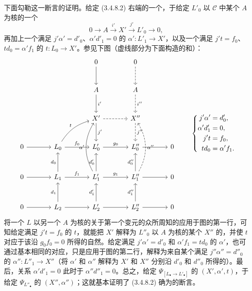 下面勾勒这一断言的证明。给定 (3.4.8.2) 右端的一个，于给定 $L'_0$ 以 $\mathcal C$ 中某个 $A$ 为核的一个
\[
0\longrightarrow A\xrightarrow{i'}X'\xrightarrow{j'}L'_0\longrightarrow0,
\]
再加上一个满足 $j'\alpha'=d'_0$、$\alpha'd'_1=0$ 的 $\alpha':L'_1\to X'$，以及一个满足 $j't=f_0$、$td_0=\alpha'f_1$ 的 $t:L_0\to X'$。参见下图（虚线部分为下面构造的和）：
\[
\begin{tikzcd}[column sep=large,row sep=large]
&&0\arrow[d]&0\arrow[d,dashed]\\
&&A\arrow[d,"i'"]&A\arrow[d,dashed,"i''"]\\
&&X'\arrow[d,"j'"]\arrow[r,dashed]&X''\arrow[d,dashed,"j''"]\\
0\arrow[r]&L_0\arrow[r,"f_0"]\arrow[ur,bend left=20,"t"]&L'_0\arrow[r,"g_0"]&L''_0\arrow[r]&0\\
0\arrow[r]&L_1\arrow[u,"d_0"]\arrow[r,"f_1"]&L'_1\arrow[u,"d'_0"]\arrow[uu,bend left=30,"\alpha'"]\arrow[r,"g_1"]&L''_1\arrow[u,"d''_0"]\arrow[uu,bend right=30,dashed,"\alpha''"']\arrow[r]&0\\
0\arrow[r]&L_2\arrow[u,"d_1"]\arrow[r]&L'_2\arrow[u,"d'_1"]\arrow[r]&L''_2\arrow[u,"d''_1"]\arrow[r]&0
\end{tikzcd}
\qquad
\left\{\begin{aligned}
j'\alpha'&=d'_0,\\
\alpha'd'_1&=0,\\
j't&=f_0,\\
td_0&=\alpha'f_1.
\end{aligned}\right.
\]
将一个 $L$ 以另一个 $A$ 为核的关于第一个变元的众所周知的应用于图的第一行，可知给定满足 $j't=f_0$ 的 $t$，就能把 $X'$ 解释为 $L''_0$ 以 $A$ 为核的某个 $X''$ 的，并使 $t$ 对应于该沿 $g_0f_0=0$ 所得的自然。给定满足 $j'\alpha'=d'_0$ 和 $\alpha'f_1=td_0$ 的 $\alpha'$，也可通过基本相同的对应，只是应用于图的第二行，解释为来自某个满足 $j''\alpha''=d''_0$ 的 $\alpha'':L''_1\to X''$（将 $\alpha'$ 和 $\alpha''$ 解释为 $X'$ 和 $X''$ 分别沿 $d'_0$ 和 $d''_0$ 所得的）。最后，关系 $\alpha'd'_1=0$ 此时于 $\alpha''d''_1=0$。总之，给定 $\Psi_{[L_\bullet\to L'_\bullet]}$ 的 $(X',\alpha',t)$，于给定 $\Psi_{L''_\bullet}$ 的 $(X'',\alpha'')$；这就基本证明了 (3.4.8.2) 确为的断言。

